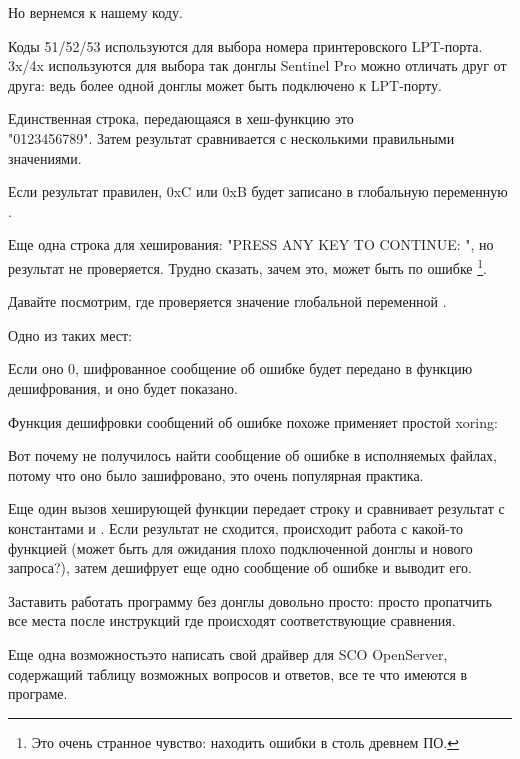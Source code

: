 Но вернемся к нашему коду.

Коды 51/52/53 используются для выбора номера принтеровского LPT-порта.
3x/4x используются для выбора  так донглы Sentinel Pro
можно отличать друг от друга: ведь более одной донглы может быть подключено к LPT-порту.

Единственная строка, передающаяся в хеш-функцию это\\
 "0123456789".
Затем результат сравнивается с несколькими правильными значениями.

Если результат правилен, 0xC или 0xB будет записано в глобальную переменную .

Еще одна строка для хеширования:
"PRESS ANY KEY TO CONTINUE: ", но результат не проверяется.
Трудно сказать, зачем это, может быть по ошибке
\footnote{Это очень странное чувство: находить ошибки в столь древнем ПО.}.

Давайте посмотрим, где проверяется значение глобальной переменной .

Одно из таких мест:



Если оно 0, шифрованное сообщение об ошибке будет передано в функцию дешифрования, и оно будет 
показано.

Функция дешифровки сообщений об ошибке похоже применяет простой \gls{xoring}:



Вот почему не получилось найти сообщение об ошибке в исполняемых файлах, потому что оно было
зашифровано, это очень популярная практика.

Еще один вызов хеширующей функции передает строку
 и сравнивает результат с константами
 и .
Если результат не сходится, происходит работа с какой-то функцией  
(может быть для ожидания плохо подключенной донглы и нового запроса?), затем дешифрует
еще одно сообщение об ошибке и выводит его.



Заставить работать программу без донглы довольно просто: просто пропатчить все места после инструкций
\CMP где происходят соответствующие сравнения.

Еще одна возможность\EMDASH{}это написать свой драйвер для SCO OpenServer, содержащий таблицу возможных вопросов и ответов, все те что имеются в програме.

